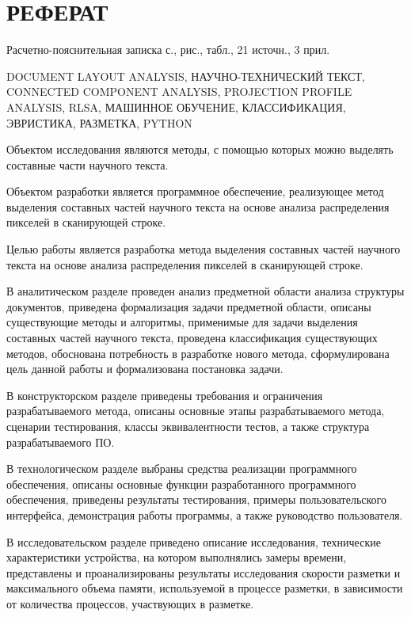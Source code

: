 \section*{РЕФЕРАТ}

Расчетно-пояснительная записка \pageref{LastPage} с.,  рис.,  табл., 21 источн., 3 прил.

DOCUMENT LAYOUT ANALYSIS,
НАУЧНО-ТЕХНИЧЕСКИЙ ТЕКСТ,
CONNECTED COMPONENT ANALYSIS,
PROJECTION PROFILE ANALYSIS,
RLSA,
МАШИННОЕ ОБУЧЕНИЕ,
КЛАССИФИКАЦИЯ,
ЭВРИСТИКА,
РАЗМЕТКА,
PYTHON

Объектом исследования являются методы, с помощью которых можно выделять составные части научного текста.

Объектом разработки является программное обеспечение, реализующее метод выделения составных частей научного текста на основе анализа распределения пикселей в сканирующей строке.

Целью работы является разработка метода выделения составных частей научного текста на основе анализа распределения пикселей в сканирующей строке.

В аналитическом разделе проведен анализ предметной области анализа структуры документов, приведена формализация задачи предметной области, описаны существующие методы и алгоритмы, применимые для задачи выделения составных частей научного текста, проведена классификация существующих методов, обоснована потребность в разработке нового метода, сформулирована цель данной работы и формализована постановка задачи.

В конструкторском разделе приведены требования и ограничения разрабатываемого метода, описаны основные этапы разрабатываемого метода, сценарии тестирования, классы эквивалентности тестов, а также структура разрабатываемого ПО.

В технологическом разделе выбраны средства реализации программного обеспечения, описаны основные функции разработанного программного обеспечения, приведены результаты тестирования, примеры пользовательского интерфейса, демонстрация работы программы, а также руководство пользователя.

В исследовательском разделе приведено описание исследования, технические характеристики устройства, на котором выполнялись замеры времени, представлены и проанализированы результаты исследования скорости разметки и максимального объема памяти, используемой в процессе разметки, в зависимости от количества процессов, участвующих в разметке.

